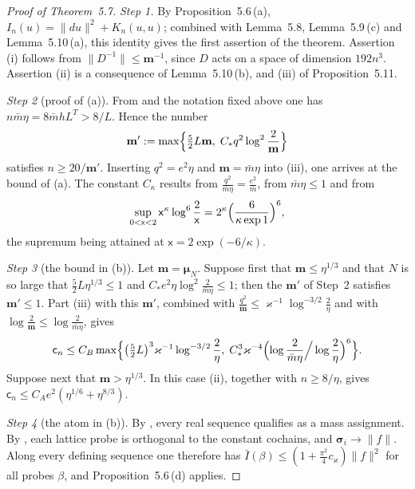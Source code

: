 \documentclass[11pt]{amsart}
\theoremstyle{definition}
\begin{document}
\begin{proof}[Proof of Theorem~5.7]
\emph{Step 1.}
By Proposition~5.6\,(a), $I_n(u)=\|du\|^2+K_n(u,u)$; combined with Lemma~5.8, Lemma~5.9\,(c) and Lemma~5.10\,(a), this identity gives the first assertion of the theorem.
Assertion (i) follows from $\|D^{-1}\|\le\mathbf m^{-1}$, since $D$ acts on a space of dimension $192n^3$.
Assertion (ii) is a consequence of Lemma~5.10\,(b), and (iii) of Proposition~5.11.

\emph{Step 2} (proof of (a)).
From \cite[Section~1.2]{QEDII} and the notation fixed above one has $n\bar m\eta=8\bar mhL^T>8/L$.
Hence the number
\begin{equation*}
\mathbf m':=\max\Bigl\{\tfrac52L\mathbf m,\;C_*q^2\log^2\frac2{\mathbf m}\Bigr\}
\end{equation*}
satisfies $n\ge20/\mathbf m'$.
Inserting $q^2=e^2\eta$ and $\mathbf m=\bar m\eta$ into (iii), one arrives at the bound of (a).
The constant $C_\kappa$ results from $\frac{q^2}{\bar m\eta}=\frac{e^2}{\bar m}$, from $\bar m\eta\le1$ and from
\begin{equation*}
\sup_{0<\mathsf x<2}\mathsf x^\kappa\log^6\frac2{\mathsf x}=2^\kappa\Bigl(\frac{6}{\kappa\exp1}\Bigr)^6,
\end{equation*}
the supremum being attained at $\mathsf x=2\exp(-6/\kappa)$.

\emph{Step 3} (the bound in (b)).
Let $\mathbf m=\boldsymbol\mu_N$.
Suppose first that $\mathbf m\le\eta^{1/3}$ and that $N$ is so large that $\frac52L\eta^{1/3}\le1$ and $C_*e^2\eta\log^2\frac2{\bar m\eta}\le1$; then the $\mathbf m'$ of Step~2 satisfies $\mathbf m'\le1$.
Part (iii) with this $\mathbf m'$, combined with $\frac{q^2}{\mathbf m}\le\varkappa^{-1}\log^{-3/2}\frac2\eta$ and with $\log\frac2{\mathbf m}\le\log\frac2{\bar m\eta}$, gives
\begin{equation*}
\mathsf c_n\le C_B\max\Bigl\{\bigl(\tfrac52L\bigr)^3\varkappa^{-1}\log^{-3/2}\frac2\eta,\;C_*^3\varkappa^{-4}\Bigl(\log\frac2{\bar m\eta}\Big/\log\frac2\eta\Bigr)^6\Bigr\}.
\end{equation*}
Suppose next that $\mathbf m>\eta^{1/3}$.
In this case (ii), together with $n\ge8/\eta$, gives $\mathsf c_n\le C_Ae^2(\eta^{1/6}+\eta^{8/3})$.

\emph{Step 4} (the atom in (b)).
By \cite[Section~1.2]{QEDII}, every real sequence qualifies as a mass assignment.
By \cite[Proposition~47.1\,(b1), (b5)]{QEDIII}, each lattice probe is orthogonal to the constant cochains, and $\boldsymbol\sigma_i\to\|f\|$.
Along every defining sequence one therefore has $\bar I(\beta)\le(1+\frac{\pi^2}{4}c_\varkappa)\|f\|^2$ for all probes $\beta$, and Proposition~5.6\,(d) applies.


\end{proof}
\end{document}
